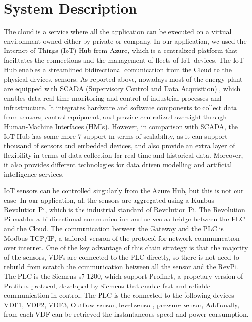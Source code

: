\section{System Description}

The cloud is a service where all the application can be executed on a virtual 
environment owned either by private or company. In our application, we used the 
Internet of Things (IoT) Hub from Azure, which is a centralized platform that facilitates the 
connections and the management of fleets of IoT devices. The IoT Hub enables a streamlined 
bidirectional comunication from the Cloud to the physical devices, sensors.
As reported above, nowadays most of the energy plant are equipped with SCADA 
(Supervisory Control and Data Acquisition) \cite{daneels1999scada}, which enables data 
real-time monitoring and control of industrial processes and infrastructure.
It integrates hardware and 
software components to collect data from sensors, control equipment, and provide 
centralized oversight through Human-Machine Interfaces (HMIs). However, in comparison with SCADA, the IoT Hub has some more 7
support in terms of scalability, as it can support thousand of sensors and embedded devices, and also provide an extra layer of 
flexibility in terms of data collection for real-time and historical data. Moreover, it also provides different technologies for 
data driven modelling and artificial intelligence services. 

IoT sensors can be controlled singularly from the Azure Hub, but this is not our case. In our application, all the sensors are 
aggregated using a Kunbus Revolution Pi, which is the industrial standard of Revolution Pi. 
The Revolution Pi enables a bi-directional communication and serves as bridge between the PLC and the Cloud. 
The communication between the Gateway and the PLC is Modbus TCP/IP, a tailored version of the protocol for network communication 
over internet. One of the key advantage of this chain strategy is that the majority of the sensors, VDFs are connected to the 
PLC directly, so there is not need to rebuild from scratch the communication between all the sensor and the RevPi. 
The PLC is the Siemens s7-1200, which support Profinet, a propetary version of Profibus protocol, developed by Siemens that enable fast and reliable communication in control. 
The PLC is the connected to the following devices: VDF1, VDF2, VDF3, Outflow sensor, level sensor, pressure sensor, 
Addionally, from each VDF can be retrieved the instantaneous speed and power consumption. 

